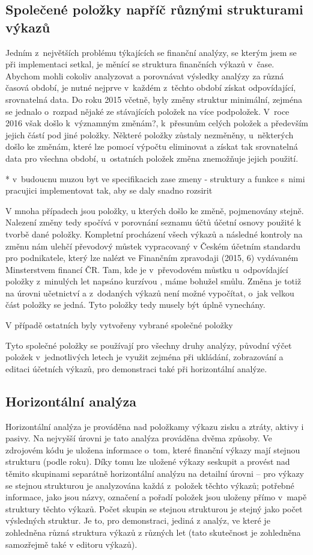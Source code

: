 \subsection{Společené položky napříč různými strukturami výkazů}
Jedním z~největších problému týkajících se finanční analýzy, se kterým jsem se při implementaci setkal, je měnící se struktura finančních výkazů v~čase. Abychom mohli cokoliv analyzovat a porovnávat výsledky analýzy za různá časová období, je nutné nejprve v~každém z~těchto období získat odpovídající, srovnatelná data. Do roku 2015 včetně, byly změny struktur minimální, zejména se jednalo o~rozpad nějaké ze stávajících položek na více podpoložek. V~roce 2016 však došlo k~významným změnám?, k~přesunům celých položek a především jejich částí pod jiné položky. Některé položky zůstaly nezměněny, u~některých došlo ke změnám, které lze pomocí výpočtu eliminovat a získat tak srovnatelná data pro všechna období, u~ostatních položek změna znemožňuje jejich použití. 

* v~budoucnu muzou byt ve specifikacich zase zmeny - struktury a funkce s~nimi pracujici implementovat tak, aby se daly snadno rozsirit

V mnoha případech jsou položky, u kterých došlo ke změně, pojmenovány stejně. Nalezení změny tedy spočívá v porovnání seznamu účtů účetní osnovy použité k tvorbě dané položky. Kompletní procházení všech výkazů a následné kontroly na změnu nám ulehčí převodový můstek vypracovaný v Českém účetním standardu pro podnikatele, který lze nalézt ve Finančním zpravodaji (2015, 6) vydávaném Minsterstvem financí ČR. Tam, kde je v~převodovém můstku u~odpovídající položky z~minulých let napsáno kurzívou , máme bohužel smůlu. Změna je totiž na úrovni učetnictví a z~dodaných výkazů není možné vypočítat, o~jak velkou část položky se jedná. Tyto položky tedy musely být úplně vynechány.

V případě ostatních byly vytvořeny vybrané společné položky

Tyto společné položky se používají pro všechny druhy analýzy, původní výčet položek v~jednotlivých letech je využit zejména při ukládání, zobrazování a editaci účetních výkazů, pro demonstraci také při horizontální analýze.


\subsection{Horizontální analýza}
Horizontální analýza je prováděna nad položkamy výkazu zisku a ztráty, aktivy i pasivy. Na nejvyšší úrovni je tato analýza prováděna dvěma způsoby. Ve zdrojovém kódu je uložena informace o~tom, které finanční výkazy mají stejnou strukturu (podle roku). Díky tomu lze uložené výkazy seskupit a provést nad těmito skupinami separátně horizontální analýzu na detailní úrovni -- pro výkazy se stejnou strukturou je analyzována každá z~položek těchto výkazů; potřebné informace, jako jsou názvy, označení a pořadí položek jsou uloženy přímo v~mapě struktury těchto výkazů. Počet skupin se stejnou strukturou je stejný jako počet výsledných struktur. Je to, pro demonstraci, jediná z analýz, ve které je zohledněna různá struktura výkazů z různých let (tato skutečnost je zohledněna samozřejmě také v editoru výkazů).

